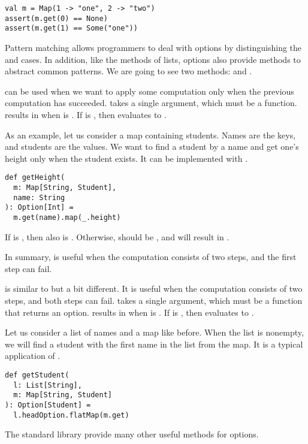 \begin{verbatim}
val m = Map(1 -> "one", 2 -> "two")
assert(m.get(0) == None)
assert(m.get(1) == Some("one"))
\end{verbatim}

Pattern matching allows programmers to deal with options by
distinguishing the  and  cases. In addition, like the
methods of lists, options also provide methods to abstract common patterns.
We are going to see two methods:  and .

 can be used when we want to apply some computation only when the
previous computation has succeeded.  takes a single argument, which
must be a function.  results in  when  is
. If  is , then  evaluates
to .

As an example, let us consider a map containing students.
Names are the keys, and students are the values. We want to find a student by a name and
get one's height only when the student exists. It can be implemented with
.

\begin{verbatim}
def getHeight(
  m: Map[String, Student],
  name: String
): Option[Int] =
  m.get(name).map(_.height)
\end{verbatim}

If  is , then  also
is . Otherwise,  should be , and
 will result in .

In summary,  is useful when the computation consists of two steps, and
the first step can fail.

 is similar to  but a bit different. It is useful when
the computation consists of two steps, and both steps can fail.
 takes a single argument, which must be a function that returns an option.
 results in  when  is
. If  is , then  evaluates
to .

Let us consider a list of names and a map like before.
When the list is nonempty, we will find a student with the first name in the
list from the map. It is a typical application of .

\begin{verbatim}
def getStudent(
  l: List[String],
  m: Map[String, Student]
): Option[Student] =
  l.headOption.flatMap(m.get)
\end{verbatim}

The standard library provide many other useful methods for
options.
